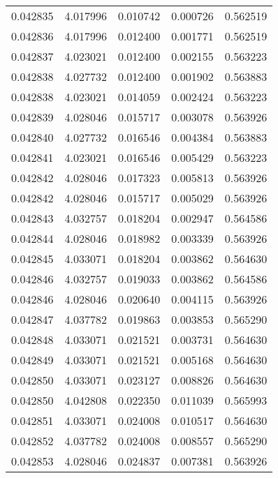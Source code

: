 \begin{tabular}{lrrrr}
0.042835    &  4.017996 &  0.010742 &  0.000726 &             0.562519 \\
0.042836    &  4.017996 &  0.012400 &  0.001771 &             0.562519 \\
0.042837    &  4.023021 &  0.012400 &  0.002155 &             0.563223 \\
0.042838    &  4.027732 &  0.012400 &  0.001902 &             0.563883 \\
0.042838    &  4.023021 &  0.014059 &  0.002424 &             0.563223 \\
0.042839    &  4.028046 &  0.015717 &  0.003078 &             0.563926 \\
0.042840    &  4.027732 &  0.016546 &  0.004384 &             0.563883 \\
0.042841    &  4.023021 &  0.016546 &  0.005429 &             0.563223 \\
0.042842    &  4.028046 &  0.017323 &  0.005813 &             0.563926 \\
0.042842    &  4.028046 &  0.015717 &  0.005029 &             0.563926 \\
0.042843    &  4.032757 &  0.018204 &  0.002947 &             0.564586 \\
0.042844    &  4.028046 &  0.018982 &  0.003339 &             0.563926 \\
0.042845    &  4.033071 &  0.018204 &  0.003862 &             0.564630 \\
0.042846    &  4.032757 &  0.019033 &  0.003862 &             0.564586 \\
0.042846    &  4.028046 &  0.020640 &  0.004115 &             0.563926 \\
0.042847    &  4.037782 &  0.019863 &  0.003853 &             0.565290 \\
0.042848    &  4.033071 &  0.021521 &  0.003731 &             0.564630 \\
0.042849    &  4.033071 &  0.021521 &  0.005168 &             0.564630 \\
0.042850    &  4.033071 &  0.023127 &  0.008826 &             0.564630 \\
0.042850    &  4.042808 &  0.022350 &  0.011039 &             0.565993 \\
0.042851    &  4.033071 &  0.024008 &  0.010517 &             0.564630 \\
0.042852    &  4.037782 &  0.024008 &  0.008557 &             0.565290 \\
0.042853    &  4.028046 &  0.024837 &  0.007381 &             0.563926 \\

\end{tabular}
